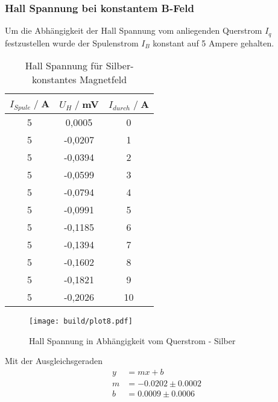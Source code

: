 \subsubsection{Hall Spannung bei konstantem B-Feld}
Um die Abhängigkeit der Hall Spannung vom anliegenden Querstrom $I_q$ festzustellen wurde der Spulenstrom $I_B$ konstant auf 5 Ampere gehalten.
\begin{table}
    \centering
    \begin{tabular}{c c c}
        \toprule
        $I_{Spule} \;/\;$A & $U_H\;/\;$mV & $I_{durch} \;/\;$A\\
        \midrule
  5                   &0,0005&              0\\
  5                   &-0,0207&             1\\
  5                   &-0,0394&             2\\
  5                   &-0,0599&             3\\
  5                   &-0,0794&             4\\
  5                   &-0,0991&             5\\
  5                   &-0,1185&             6\\
  5                   &-0,1394&             7\\
  5                   &-0,1602&             8\\
  5                   &-0,1821&             9\\
  5                   &-0,2026&             10\\

       \bottomrule
    \end{tabular}
    \caption{Hall Spannung für Silber- konstantes Magnetfeld}
    \label{tab:Ag_I}
\end{table}
\begin{figure}[H]
    \centering
    \texttt{[image: build/plot8.pdf]}
    \caption{Hall Spannung in Abhängigkeit vom Querstrom - Silber}
    \label{fig:Ag_I}
\end{figure}
Mit der Ausgleichsgeraden
\begin{align*}
    y &= mx + b\\
    m &= -0.0202\pm 0.0002\\
    b &=  0.0009\pm 0.0006\\
\end{align*}


